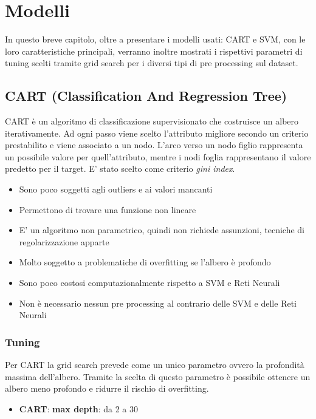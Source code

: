 \chapter{Modelli}
\label{ch:modelli}
In questo breve capitolo, oltre a presentare i modelli usati: CART e SVM, con le loro caratteristiche principali, verranno inoltre mostrati i rispettivi parametri di tuning scelti tramite grid search per i diversi tipi di pre processing sul dataset.

\section{CART (Classification And Regression Tree)}
CART è un algoritmo di classificazione supervisionato che costruisce un albero iterativamente. Ad ogni passo viene scelto l'attributo migliore secondo un criterio prestabilito e viene associato a un nodo.
L'arco verso un nodo figlio rappresenta un possibile valore per quell'attributo, mentre i nodi foglia rappresentano il valore predetto per il target.
E' stato scelto come criterio \textit{gini index}.

\begin{itemize}
    \item Sono poco soggetti agli outliers e ai valori mancanti
    \item Permettono di trovare una funzione non lineare 
    \item E' un algoritmo non parametrico, quindi non richiede assunzioni, tecniche di regolarizzazione apparte
    \item Molto soggetto a problematiche di overfitting se l'albero è profondo
    \item Sono poco costosi computazionalmente rispetto a SVM e Reti Neurali
    \item Non è necessario nessun pre processing al contrario delle SVM e delle Reti Neurali
\end{itemize}

\newpage

\subsection*{Tuning}Per CART la grid search prevede come un unico parametro ovvero la profondità massima dell'albero. Tramite la scelta di questo parametro è possibile ottenere un albero meno profondo e ridurre il rischio di overfitting.

\begin{itemize}
    \item \textbf{CART}: \textbf{max depth}: da 2 a 30
\end{itemize}

